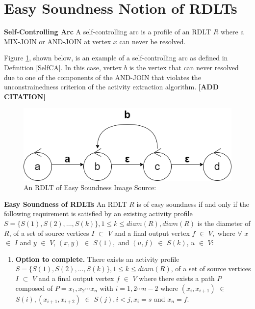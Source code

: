 \section{Easy Soundness Notion of RDLTs}

\begin{defn}\textbf{Self-Controlling Arc}
    \label{SelfCA}
    A self-controlling arc is a profile of an RDLT $ R $ where a MIX-JOIN or AND-JOIN at vertex $ x $ can never be resolved. 
\end{defn}

Figure \ref{SelfControllingArc}, shown below, is an example of a self-controlling arc as defined in Definition \ref{SelfCA}. In this case, vertex $ b $ is the vertex that can never resolved due to one of the components of the AND-JOIN that violates the unconstrainedness criterion of the activity extraction algorithm.
 \textbf{[ADD CITATION]}
\begin{figure}[H]
    \centering
    \includegraphics[width=12cm]{../figures/Self-Controlling Loop.png}
    \caption{An RDLT of Easy Soundness Image Source: \cite{Ramirez2024}}
    \label{SelfControllingArc}
\end{figure}

\begin{defn}\textbf{Easy Soundness of RDLTs}
    \label{EasyRDLTDef}
    An RDLT $ R $ is of easy soundness if and only if the following requirement is satisfied by an existing activity profile $ S = \{S(1), S(2), ..., S(k)\}, 1 \leq k \leq diam(R), diam(R) $ is the diameter of $ R $, of a set of source vertices $ I $ $ \subset $ $ V $ and a final output vertex $ f $ $ \in $ $ V, $ where $ \forall $ $ x $ $ \in $ $ I $ and $ y $ $ \in $ $ V $, $ (x,y) $ $ \in $ $ S(1), $ and $ (u,f) $ $ \in $ $ S(k) $, $ u $ $ \in $ $ V $:
    \begin{enumerate}
        \item \textbf{Option to complete.} There exists an activity profile $ S = \{S(1), S(2), ..., S(k)\}, 1 \leq k \leq diam(R) $, of a set of source vertices $ I $ $ \subset $ $ V $ and a final output vertex $ f $ $ \in $ $ V $ where there exists a path $ P $ composed of $ P = x_1, x_2 \cdots x_n $ with $ i = 1, 2 \cdots n - 2 $ where $ (x_i, x_{i+1}) $ $ \in $ $ S(i), (x_{i+1}, x_{i+2}) $ $ \in $ $ S(j), i < j, x_i = s $ and $ x_n = f $.
    \end{enumerate}
\end{defn}


